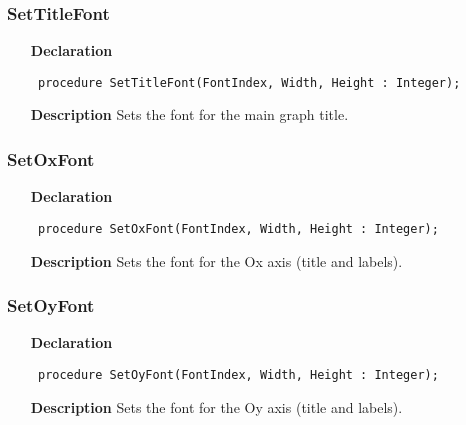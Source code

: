 \documentclass[12pt,a4paper,oneside]{report}
\newcommand{\declarationitem}[1]{\textbf{#1}}
\newcommand{\descriptiontitle}[1]{\textbf{#1}}
\newcommand{\code}[1]{\texttt{#1}}
\begin{document}
\subsubsection{SetTitleFont}
\label{uplot-SetTitleFont}
\begin{itemize}\item[\declarationitem{Declaration}\hfill]
	\begin{flushleft}
		\code{
			procedure SetTitleFont(FontIndex, Width, Height : Integer);}
		
	\end{flushleft}
	
	\par
	\item[\descriptiontitle{Description}]
	Sets the font for the main graph title.
	
\end{itemize}
\subsubsection{SetOxFont}
\label{uplot-SetOxFont}
\begin{itemize}\item[\declarationitem{Declaration}\hfill]
	\begin{flushleft}
		\code{
			procedure SetOxFont(FontIndex, Width, Height : Integer);}
		
	\end{flushleft}
	
	\par
	\item[\descriptiontitle{Description}]
	Sets the font for the Ox axis (title and labels).
	
\end{itemize}
\subsubsection{SetOyFont}
\label{uplot-SetOyFont}
\begin{itemize}\item[\declarationitem{Declaration}\hfill]
	\begin{flushleft}
		\code{
			procedure SetOyFont(FontIndex, Width, Height : Integer);}
		
	\end{flushleft}
	
	\par
	\item[\descriptiontitle{Description}]
	Sets the font for the Oy axis (title and labels).
	
\end{itemize}
\end{document}
